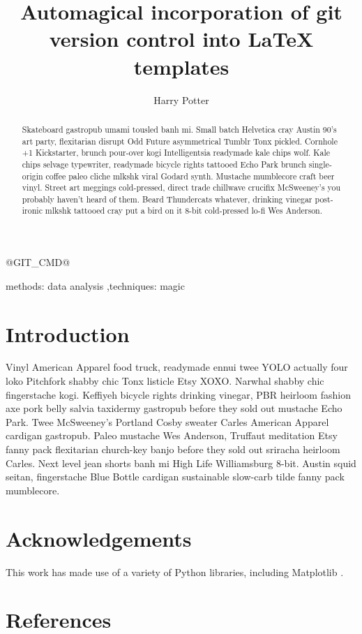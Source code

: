 \documentclass[5p,authoryear]{elsarticle}
\begin{document}
\newcommand{\code}[1]{\texttt{#1}}
\newcommand{\degrees}[1]{$#1^\circ$}

@GIT_CMD@

\begin{frontmatter}

\title{Automagical incorporation of git version control into LaTeX templates }

\author[Hogwarts]{Harry Potter}


\address[Hogwarts]{Hogwarts school for magic}

\begin{abstract}
Skateboard gastropub umami tousled banh mi. Small batch Helvetica cray Austin
90's art party, flexitarian disrupt Odd Future asymmetrical Tumblr Tonx
pickled. Cornhole +1 Kickstarter, brunch pour-over kogi Intelligentsia
readymade kale chips wolf. Kale chips selvage typewriter, readymade bicycle
rights tattooed Echo Park brunch single-origin coffee paleo cliche mlkshk viral
Godard synth. Mustache mumblecore craft beer vinyl. Street art meggings
cold-pressed, direct trade chillwave crucifix McSweeney's you probably haven't
heard of them. Beard Thundercats whatever, drinking vinegar post-ironic mlkshk
tattooed cray put a bird on it 8-bit cold-pressed lo-fi Wes Anderson.
\end{abstract}

\begin{keyword}
methods: data analysis \sep  techniques: magic
\end{keyword}

\end{frontmatter}

\section{Introduction}
\label{sec:intro}
Vinyl American Apparel food truck, readymade ennui twee YOLO actually four loko
Pitchfork shabby chic Tonx listicle Etsy XOXO. Narwhal shabby chic fingerstache
kogi. Keffiyeh bicycle rights drinking vinegar, PBR heirloom fashion axe pork
belly salvia taxidermy gastropub before they sold out mustache Echo Park. Twee
McSweeney's Portland Cosby sweater Carles American Apparel cardigan gastropub.
Paleo mustache Wes Anderson, Truffaut meditation Etsy fanny pack flexitarian
church-key banjo before they sold out sriracha heirloom Carles. Next level jean
shorts banh mi High Life Williamsburg 8-bit. Austin squid seitan, fingerstache
Blue Bottle cardigan sustainable slow-carb tilde fanny pack mumblecore.

\section{Acknowledgements}

This work has made use of a variety of Python libraries, including Matplotlib
\citep{Hunter:2007}.

\section*{References}



\end{document}
